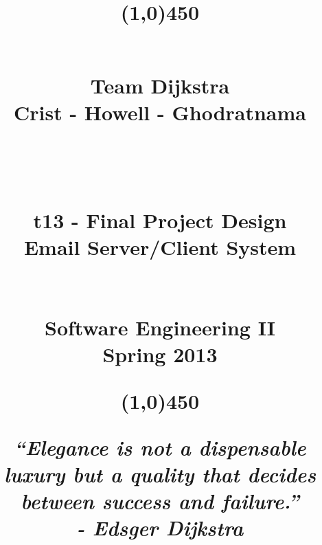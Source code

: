 \documentclass[11pt, letterpaper]{report}
\begin{document}
\title{\begin{center}
\line(1,0){450}
\end{center} \hfill \\ \Huge{Team Dijkstra }\\ \small{Crist - Howell - Ghodratnama} \\ \hfill \\ \hfill \\ \hfill \\ \huge{t13 - Final Project Design} \\ \LARGE{Email Server/Client System} \\ \hfill \\ \hfill  \\ \Large{Software Engineering II} \\ \small{Spring 2013} \\ \begin{center}
\line(1,0){450}
\end{center}\small{\textit{``Elegance is not a dispensable luxury but a quality that decides between success and failure.'' \\- Edsger Dijkstra}}}
\date{ }

\maketitle
\newpage
\end{document}
